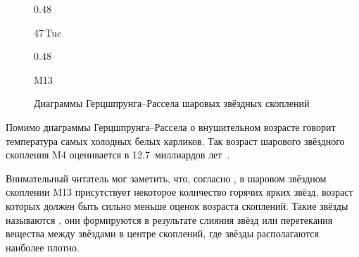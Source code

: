 \begin{figure}[h!]
    \begin{subcaptionblock}{0.48\tw}
        \centering
        \caption{47\,Tuc}
    \end{subcaptionblock}
    \hfill
    \begin{subcaptionblock}{0.48\tw}
        \centering
        \caption{M13}
        \label{pic:hr-m13}
    \end{subcaptionblock}
    \caption{Диаграммы Герцшпрунга--Рассела шаровых звёздных скоплений}
    \label{pic:hr-globular-clusters}
\end{figure}

Помимо диаграммы Герцшпрунга--Рассела о внушительном возрасте говорит температура самых холодных белых карликов. Так возраст шарового звёздного скопления M4 оценивается в 12.7~миллиардов лет~\cite{whiteDwarfCooling}.
 
Внимательный читатель мог заметить, что, согласно , в шаровом звёздном скоплении M13 присутствует некоторое количество горячих ярких звёзд, возраст которых должен быть сильно меньше оценок возраста скоплений. Такие звёзды называются , они формируются в результате слияния звёзд или перетекания вещества между звёздами в центре скоплений, где звёзды располагаются наиболее плотно.
 
